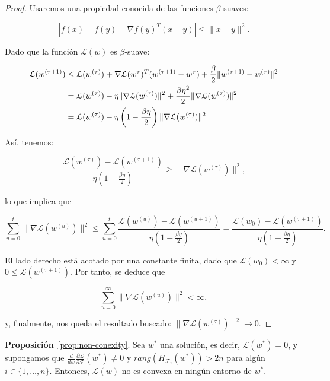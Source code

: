 \begin{proof}
  Usaremos una propiedad conocida de las funciones $\beta$-suaves:

  \[
      | f(x) - f(y) - \nabla f(y)^{T} (x-y) | \leq \| x - y \|^2.
  \]  

  Dado que la función $\mathcal{L}(w)$ es $\beta$-suave:

  \begin{align}
      \mathcal{L} (w^{(\tau + 1)}) &\leq \mathcal{L} (w^{(\tau)}) + \nabla \mathcal{L} (w^{\tau})^{T} (w^{(\tau + 1)} - w^{\tau}) + \frac{\beta}{2} \|w^{(\tau + 1)} - w^{(\tau)}\|^2 \notag \\
      &= \mathcal{L} (w^{(\tau)}) - \eta \|\nabla \mathcal{L} (w^{(\tau)})\|^2 + \frac{\beta \eta^2}{2} \|\nabla \mathcal{L} (w^{(\tau)})\|^2 \notag \\
      &= \mathcal{L} (w^{(\tau)}) - \eta \left( 1 - \frac{\beta \eta}{2} \right) \|\nabla \mathcal{L} (w^{(\tau)})\|^2.
  \end{align}

  Así, tenemos:

  \[
      \frac{\mathcal{L} (w^{(\tau)}) - \mathcal{L} (w^{(\tau + 1)})}{\eta \left( 1 - \frac{\beta \eta}{2} \right)} \geq \|\nabla \mathcal{L} (w^{(\tau)})\|^2,
  \]

  lo que implica que

  \[
      \sum_{u=0}^{t} \|\nabla \mathcal{L} (w^{(u)})\|^2 \leq \sum_{u=0}^{t} \frac{\mathcal{L} (w^{(u)}) - \mathcal{L} (w^{(u+1)})}{\eta \left( 1 - \frac{\beta \eta}{2} \right)} = \frac{\mathcal{L} (w_0) - \mathcal{L} (w^{(\tau + 1)})}{\eta \left( 1 - \frac{\beta \eta}{2} \right)}.
  \]

  El lado derecho está acotado por una constante finita, dado que $\mathcal{L} (w_0) < \infty$ y $0 \leq \mathcal{L} (w^{(\tau + 1)})$. Por tanto, se deduce que

  \[
      \sum_{u=0}^{\infty} \|\nabla \mathcal{L} (w^{(u)})\|^2 < \infty,
  \]

  y, finalmente, nos queda el resultado buscado: $\|\nabla \mathcal{L} (w^{(\tau)})\|^2 \to 0$.
\end{proof}

\textbf{Proposición}~\ref{prop:non-conexity}. Sea $w^{*}$ una solución, es decir, $\mathcal{L}(w^{*}) = 0$, y supongamos que $\frac{d}{dw}\frac{\partial \mathcal{L}}{\partial \mathcal{F}}(w^{*}) \neq 0$ y $rang(H_{\mathcal{F}_{i}}(w^{*})) > 2n$ para algún $i \in \{1, \ldots, n \}$. Entonces, $\mathcal{L}(w)$ no es convexa en ningún entorno de $w^{*}$.

